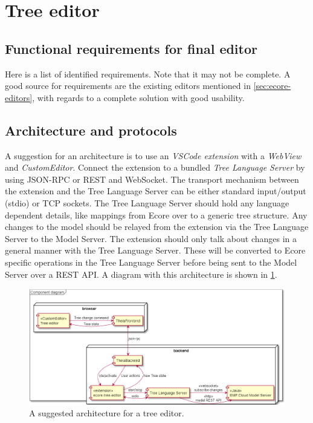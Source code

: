 \section{Tree editor}

\subsection{Functional requirements for final editor}

Here is a list of identified requirements.
Note that it may not be complete.
A good source for requirements are the existing editors mentioned in \cref{sec:ecore-editors}, with regards to a complete solution with good usability.



\subsection{Architecture and protocols}

A suggestion for an architecture is to use an \emph{VSCode extension} with a \emph{WebView} and \emph{CustomEditor}.
Connect the extension to a bundled \emph{Tree Language Server} by using \gls{JSON-RPC} or \gls{REST} and \gls{WebSocket}.
The transport mechanism between the extension and the Tree Language Server can be either standard input/output (stdio) or TCP sockets.
The Tree Language Server should hold any language dependent details, like mappings from \gls{Ecore} over to a generic tree structure.
Any changes to the model should be relayed from the extension via the Tree Language Server to the Model Server.
The extension should only talk about changes in a general manner with the Tree Language Server.
These will be converted to \gls{Ecore} specific operations in the Tree Language Server before being sent to the Model Server over a \gls{REST} \acrshort{API}.
A diagram with this architecture is shown in \cref{fig:tree-editor-architecture}.

\begin{figure}[htbp]
  \centering
  \includegraphics[width=\textwidth]{figures/tree-editor-component-diagram.png}
  \caption[Tree Editor Architecture]{A suggested architecture for a tree editor.}\label{fig:tree-editor-architecture}
\end{figure}

